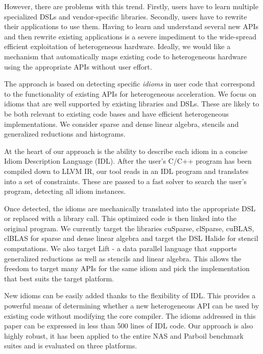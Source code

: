    However, there are problems with this trend.
    Firstly, users have to learn multiple specialized DSLs and vendor-specific
    libraries.
    Secondly, users have to rewrite their applications to use them.
    Having to learn and understand several new APIs and then rewrite existing
    applications is a severe impediment to the wide-spread efficient
    exploitation of heterogeneous hardware.
    Ideally, we would like a mechanism that automatically maps existing code to
    heterogeneous hardware using the appropriate APIs without user effort.

    The approach is based on detecting specific {\em idioms} in
    user code that correspond to the functionality of existing APIs for
    heterogeneous acceleration.
    We focus on idioms that are well supported by existing libraries and DSLs.
    These are likely to be both relevant to existing code bases and have
    efficient heterogeneous implementations.
    We consider sparse and dense linear algebra, stencils and generalized
    reductions and histograms.

    At the heart of our approach is the ability to describe each idiom in a
    concise Idiom Description Language (IDL).
    After the user's C/C++ program has been compiled down to LLVM IR, our tool
    reads in an IDL program and translates into a set of constraints.
    These are passed to a fast solver to search the user's program, detecting
    all idiom instances.

    Once detected, the idioms are mechanically translated into the appropriate
    DSL or replaced with a library call.
    This optimized code is then linked into the original program.
    We currently target the libraries cuSparse, clSparse, cuBLAS, clBLAS for
    sparse and dense linear algebra and target the DSL Halide
    \cite{Ragan-Kelley2013Halide} for stencil computations.
    We also target Lift \cite{SteuwerRD17} - a data parallel language that
    supports generalized reductions as well as stencils and linear algebra.
    This allows the freedom to target many APIs for the same idiom and pick the
    implementation that best suits the target platform. 

    New idioms can be easily added thanks to the flexibility of IDL.
    This provides a powerful means of determining whether a new heterogeneous
    API can be used by existing code without modifying the core compiler.
    The idioms addressed in this paper can be expressed in less than 500 lines
    of IDL code.
    Our approach is also highly robust, it has been applied to the entire NAS
    and Parboil benchmark suites and is evaluated on three platforms.

